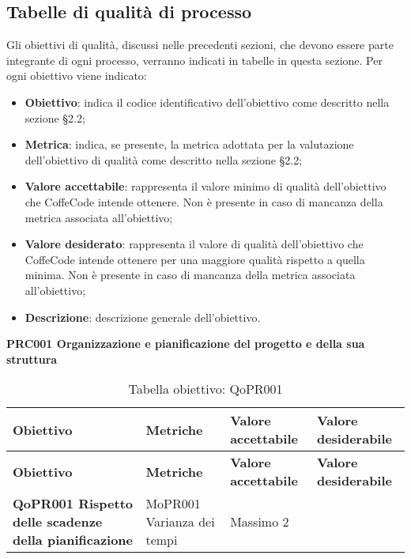 \documentclass[../piano-di-qualifica.tex]{subfiles}
\begin{document}
\subsection{Tabelle di qualità di processo}
\label{sub:tabelle_di_qualita_di_processo}
Gli obiettivi di qualità, discussi nelle precedenti sezioni, che devono essere parte integrante di ogni processo, verranno indicati in tabelle in questa sezione.
Per ogni obiettivo viene indicato:

\begin{itemize}
   \item \textbf{Obiettivo}: indica il codice identificativo dell'obiettivo come descritto nella sezione §2.2;
   \item \textbf{Metrica}: indica, se presente, la metrica adottata per la valutazione dell'obiettivo di qualità come descritto nella sezione §2.2;
   \item \textbf{Valore accettabile}: rappresenta il valore minimo di qualità dell'obiettivo che CoffeCode intende ottenere. Non è presente in caso di mancanza della metrica associata all'obiettivo;
   \item \textbf{Valore desiderato}: rappresenta il valore di qualità dell'obiettivo che CoffeCode intende ottenere per una maggiore qualità rispetto a quella minima. Non è presente in caso di mancanza della metrica associata all'obiettivo;
   \item \textbf{Descrizione}: descrizione generale dell'obiettivo.
\end{itemize}

\begin{center}
    \centering
    \textbf{PRC001 Organizzazione e pianificazione del progetto e della sua struttura}
\end{center}

\renewcommand{\arraystretch}{2} %
\begin{longtable}[H]{>{\centering\bfseries}m{5cm} >{\centering}m{5cm} >{\centering}m{2.5cm} >{\centering\arraybackslash}m{2.5cm}}  
    \caption{Tabella obiettivo: QoPR001}%
    \label{tab:requisiti_funzionali} \\
  \rowcolor{lightgray}
  {\textbf{Obiettivo}} & {\textbf{Metriche}} & {\textbf{Valore accettabile}} & {\textbf{Valore desiderabile}}  \\
  \endfirsthead%
  \rowcolor{lightgray}
  {\textbf{Obiettivo}} & {\textbf{Metriche}} & {\textbf{Valore accettabile}} & {\textbf{Valore desiderabile}}  \\
  \endhead%
  \textbf{QoPR001 Rispetto delle scadenze della pianificazione} & MoPR001 Varianza dei tempi & Massimo 2 & 0 \\
\end{longtable}
\end{document}

